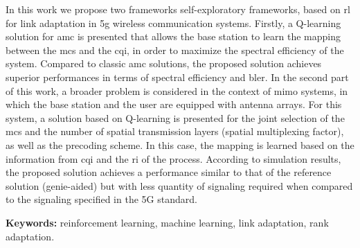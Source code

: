 \begin{resumo}

\setlength\parindent{24pt}

In this work we propose two frameworks self-exploratory frameworks, based on \gls{rl} for link adaptation in \gls{5g} wireless communication systems.
%
Firstly, a Q-learning solution for \gls{amc} is presented that allows the base station to learn the mapping between the \gls{mcs} and the \gls{cqi}, in order to maximize the spectral efficiency of the system.
%
Compared to classic \gls{amc} solutions, the proposed solution achieves superior performances in terms of spectral efficiency and \gls{bler}.
%
In the second part of this work, a broader problem is considered in the context of \gls{mimo} systems, in which the base station and the user are equipped with antenna arrays.
%
For this system, a solution based on Q-learning is presented for the joint selection of the \gls{mcs} and the number of spatial transmission layers (spatial multiplexing factor), as well as the precoding scheme.
%
In this case, the mapping is learned based on the information from \gls{cqi} and the \gls{ri} of the process.
%
According to simulation results, the proposed solution achieves a performance similar to that of the reference solution (genie-aided) but with less quantity of signaling required when compared to the signaling specified in the 5G standard.
%
%

\vspace*{2ex}
\textbf{Keywords: } reinforcement learning, machine learning, link adaptation, rank adaptation.
\end{resumo}
